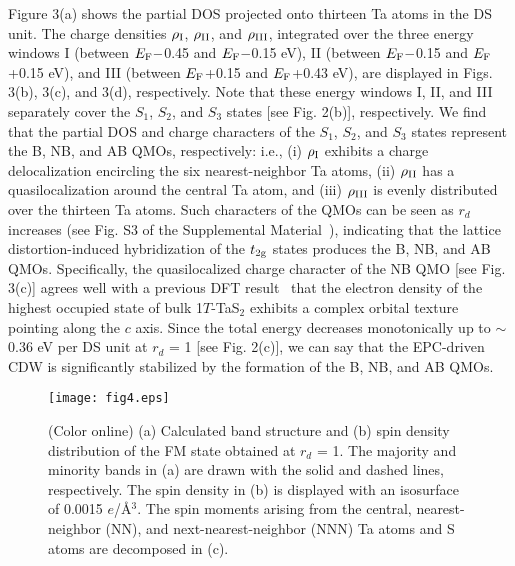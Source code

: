 \documentclass[aps,prl,twocolumn,showpacs,byrevtex]{revtex4}
\begin{document}
Figure 3(a) shows the partial DOS projected onto thirteen Ta atoms in the DS unit. The charge densities ${\rho}_{\rm I}$, ${\rho}_{\rm II}$, and ${\rho}_{\rm III}$, integrated over the three energy windows I (between $E_{\rm F}-$0.45 and $E_{\rm F}-$0.15 eV), II (between $E_{\rm F}-$0.15 and $E_{\rm F}$+0.15 eV), and III (between $E_{\rm F}$+0.15 and $E_{\rm F}$+0.43 eV), are displayed in Figs. 3(b), 3(c), and 3(d), respectively. Note that these energy windows I, II, and III separately cover the $S_1$, $S_2$, and $S_3$ states [see Fig. 2(b)], respectively. We find that the partial DOS and charge characters of the $S_1$, $S_2$, and $S_3$ states represent the B, NB, and AB QMOs, respectively: i.e., (i) ${\rho}_{\rm I}$ exhibits a charge delocalization encircling the six nearest-neighbor Ta atoms, (ii) ${\rho}_{\rm II}$ has a quasilocalization around the central Ta atom, and (iii) ${\rho}_{\rm III}$ is evenly distributed over the thirteen Ta atoms. Such characters of the QMOs can be seen as $r_d$ increases (see Fig. S3 of the Supplemental Material~\cite{SM}), indicating that the lattice distortion-induced hybridization of the $t_{\rm 2g}$ states produces the B, NB, and AB QMOs. Specifically, the quasilocalized charge character of the NB QMO [see Fig. 3(c)] agrees well with a previous DFT result~\cite{Ritschel} that the electron density of the highest occupied state of bulk 1$T$-TaS$_2$ exhibits a complex orbital texture pointing along the $c$ axis. Since the total energy decreases monotonically up to ${\sim}$0.36 eV per DS unit at $r_d$ = 1 [see Fig. 2(c)], we can say that the EPC-driven CDW is significantly stabilized by the formation of the B, NB, and AB QMOs.

\begin{figure}[h!t]
\texttt{[image: fig4.eps]}
\caption{(Color online) (a) Calculated band structure and (b) spin density distribution of the FM state obtained at $r_d$ = 1. The majority and minority bands in (a) are drawn with the solid and dashed lines, respectively. The spin density in (b) is displayed with an isosurface of 0.0015 $e$/{\AA}$^3$. The spin moments arising from the central, nearest-neighbor (NN), and next-nearest-neighbor (NNN) Ta atoms and S atoms are decomposed in (c). }
\label{figure:3}
\end{figure}
\end{document}

